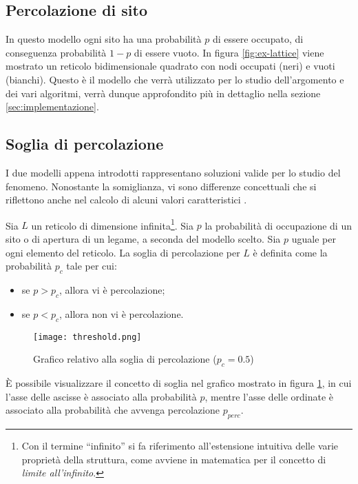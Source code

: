 \subsection*{Percolazione di sito}
In questo modello ogni sito ha una probabilità $p$ di essere occupato, di conseguenza
probabilità $1-p$ di essere vuoto. In figura \ref{fig:ex-lattice} viene mostrato un 
reticolo bidimensionale quadrato con nodi occupati (neri) e vuoti (bianchi). Questo è 
il modello che verrà utilizzato per lo studio dell'argomento e dei vari algoritmi, verrà
dunque approfondito più in dettaglio nella sezione \ref{sec:implementazione}.

\subsection*{Soglia di percolazione}
I due modelli appena introdotti rappresentano soluzioni valide per lo studio 
del fenomeno. Nonostante la somiglianza, vi sono differenze concettuali che si 
riflettono anche nel calcolo di alcuni valori caratteristici \cite{weisstein-bond,weisstein-site,weisstein-threshold}.

\begin{definition}
    Sia $L$ un reticolo di dimensione infinita\footnote{Con il termine ``infinito'' 
    si fa riferimento all'estensione intuitiva delle varie proprietà della struttura,
    come avviene in matematica per il concetto di \textit{limite all'infinito}.}. 
    Sia $p$ la probabilità di occupazione di un sito o di apertura 
    di un legame, a seconda del modello scelto. 
    Sia $p$ uguale per ogni elemento del reticolo.
    La soglia di percolazione per $L$ è definita come la 
    probabilità $p_c$ tale per cui:
    \begin{itemize}
        \item se $p > p_c$, allora vi è percolazione;
        \item se $p < p_c$, allora non vi è percolazione.
    \end{itemize}
\end{definition}

\begin{figure}
    \centering
    \texttt{[image: threshold.png]}
    \caption{Grafico relativo alla soglia di percolazione ($p_c=0.5$)}
    \label{fig:threshold}
\end{figure}

È possibile visualizzare il concetto di soglia nel grafico mostrato in 
figura \ref{fig:threshold}, in cui l'asse delle ascisse è associato alla 
probabilità $p$, mentre l'asse delle ordinate è associato alla probabilità
che avvenga percolazione $p_{perc}$.

